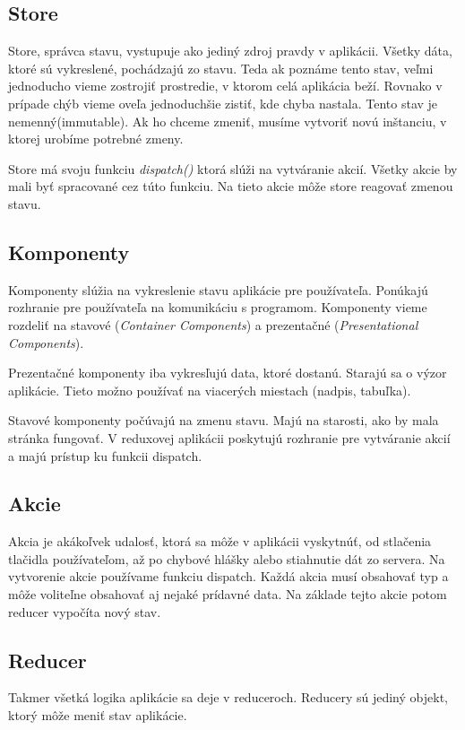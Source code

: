 \subsection{Store}
Store, správca stavu, vystupuje ako jediný zdroj pravdy v aplikácii. Všetky dáta, ktoré sú vykreslené, pochádzajú zo stavu. Teda ak poznáme tento stav, veľmi jednoducho vieme zostrojiť prostredie, v ktorom celá aplikácia beží. Rovnako v prípade chýb vieme oveľa jednoduchšie zistiť, kde chyba nastala. Tento stav je nemenný(immutable). Ak ho chceme zmeniť, musíme vytvoriť novú inštanciu, v ktorej urobíme potrebné zmeny.

Store má svoju funkciu \emph{dispatch()} ktorá slúži na vytváranie akcií. Všetky akcie by mali byť spracované cez túto funkciu. Na tieto akcie môže store reagovať zmenou stavu.

\subsection{Komponenty}
Komponenty slúžia na vykreslenie stavu aplikácie pre používateľa. Ponúkajú rozhranie pre používateľa na komunikáciu s programom. Komponenty vieme rozdeliť na stavové (\emph{Container Components}) a prezentačné (\emph{Presentational Components}).

Prezentačné komponenty iba vykresľujú data, ktoré dostanú. Starajú sa o výzor aplikácie. Tieto možno používať na viacerých miestach (nadpis, tabuľka). 

Stavové komponenty počúvajú na zmenu stavu. Majú na starosti, ako by mala stránka fungovať. V reduxovej aplikácii poskytujú rozhranie pre vytváranie akcií a majú prístup ku funkcii dispatch.

\subsection{Akcie}
Akcia je akákoľvek udalosť, ktorá sa môže v aplikácii vyskytnúť, od stlačenia tlačidla používateľom, až po chybové hlášky alebo stiahnutie dát zo servera. Na vytvorenie akcie používame funkciu dispatch. Každá akcia musí obsahovať typ a môže voliteľne obsahovať aj nejaké prídavné data. Na základe tejto akcie potom reducer vypočíta nový stav.

\subsection{Reducer}%
Takmer všetká logika aplikácie sa deje v reduceroch. Reducery sú jediný objekt, ktorý môže meniť stav aplikácie.

